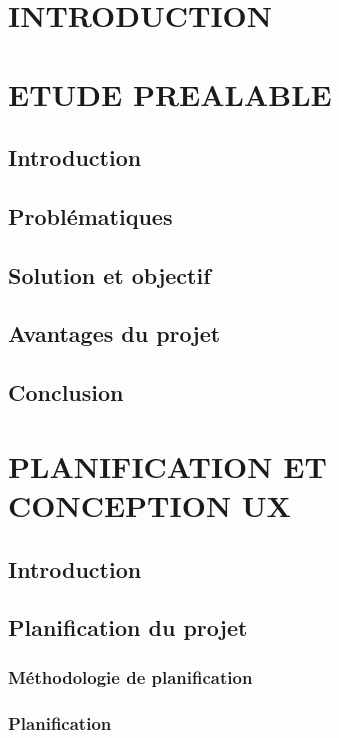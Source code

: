 
\chapter*{INTRODUCTION}

\chapter{ETUDE PREALABLE}

\section{Introduction}
\section{Problématiques}
\section{Solution et objectif}
\section{Avantages du projet}
\section{Conclusion}

\chapter{PLANIFICATION ET CONCEPTION UX}

\section{Introduction}
\section{Planification du projet}
\subsection{Méthodologie de planification}
\subsection{Planification}

